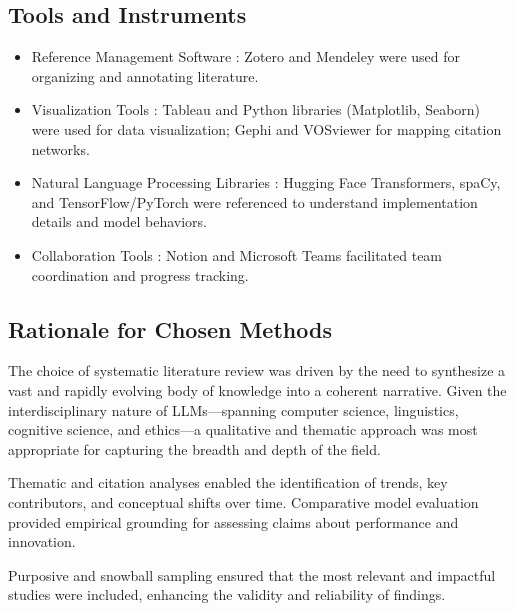 \documentclass[conference]{IEEEtran}
\begin{document}
\subsection{Tools and Instruments}
\begin{itemize}
    \item Reference Management Software : Zotero and Mendeley were used for organizing and annotating literature.
    \item Visualization Tools : Tableau and Python libraries (Matplotlib, Seaborn) were used for data visualization; Gephi and VOSviewer for mapping citation networks.
    \item Natural Language Processing Libraries : Hugging Face Transformers, spaCy, and TensorFlow/PyTorch were referenced to understand implementation details and model behaviors.
    \item Collaboration Tools : Notion and Microsoft Teams facilitated team coordination and progress tracking.   
\end{itemize}

\subsection{Rationale for Chosen Methods}
The choice of systematic literature review was driven by the need to synthesize a vast and rapidly evolving body of knowledge into a coherent narrative. Given the interdisciplinary nature of LLMs—spanning computer science, linguistics, cognitive science, and ethics—a qualitative and thematic approach was most appropriate for capturing the breadth and depth of the field.

Thematic and citation analyses enabled the identification of trends, key contributors, and conceptual shifts over time. Comparative model evaluation provided empirical grounding for assessing claims about performance and innovation.

Purposive and snowball sampling ensured that the most relevant and impactful studies were included, enhancing the validity and reliability of findings.
\end{document}
